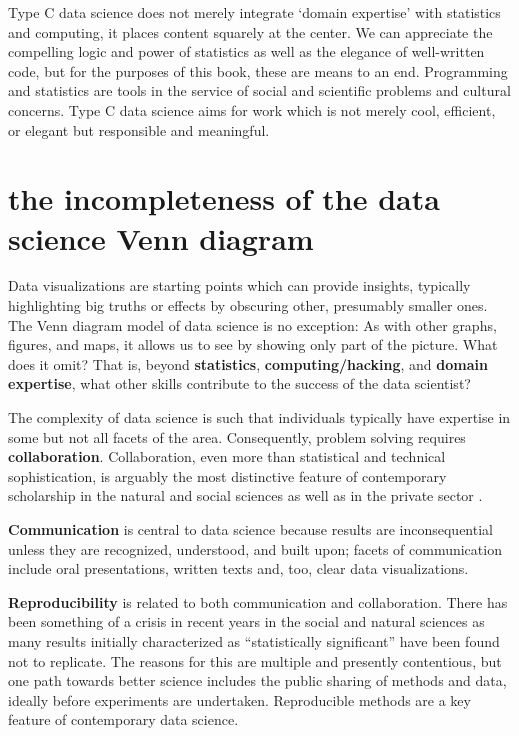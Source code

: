 \documentclass[openany]{book}
\begin{document}
Type C data science does not merely integrate `domain expertise' with statistics and computing, it places content squarely at the center. We can appreciate the compelling logic and power of statistics as well as the elegance of well-written code, but for the purposes of this book, these are means to an end. Programming and statistics are tools in the service of social and scientific problems and cultural concerns. Type C data science aims for work which is not merely cool, efficient, or elegant but responsible and meaningful.

\hypertarget{the-incompleteness-of-the-data-science-venn-diagram}{%
\section{the incompleteness of the data science Venn diagram}\label{the-incompleteness-of-the-data-science-venn-diagram}}

Data visualizations are starting points which can provide insights, typically highlighting big truths or effects by obscuring other, presumably smaller ones. The Venn diagram model of data science is no exception: As with other graphs, figures, and maps, it allows us to see by showing only part of the picture. What does it omit? That is, beyond \textbf{statistics}, \textbf{computing/hacking}, and \textbf{domain expertise}, what other skills contribute to the success of the data scientist?

The complexity of data science is such that individuals typically have expertise in some but not all facets of the area. Consequently, problem solving requires \textbf{collaboration}. Collaboration, even more than statistical and technical sophistication, is arguably the most distinctive feature of contemporary scholarship in the natural and social sciences as well as in the private sector \citep{isaacson2014innovators}.

\textbf{Communication} is central to data science because results are inconsequential unless they are recognized, understood, and built upon; facets of communication include oral presentations, written texts and, too, clear data visualizations.

\textbf{Reproducibility} is related to both communication and collaboration. There has been something of a crisis in recent years in the social and natural sciences as many results initially characterized as ``statistically significant'' have been found not to replicate. The reasons for this are multiple and presently contentious, but one path towards better science includes the public sharing of methods and data, ideally before experiments are undertaken. Reproducible methods are a key feature of contemporary data science.
\end{document}

